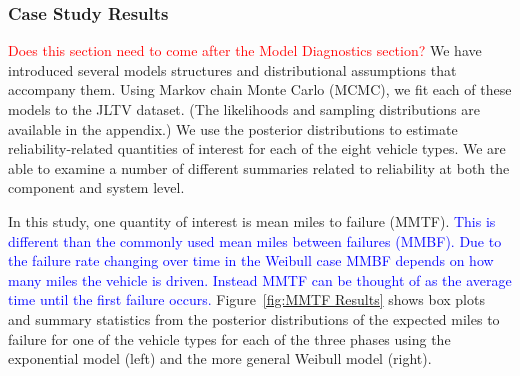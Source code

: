 \documentclass[12pt]{article}
\begin{document}
\subsubsection{Case Study Results}
\textcolor{red}{Does this section need to come after the Model Diagnostics section?}
We have introduced several models structures and distributional assumptions that accompany them.  Using Markov chain Monte Carlo (MCMC), we fit each of these models to the JLTV
dataset. (The likelihoods and sampling distributions are available in the appendix.) We use the posterior distributions to estimate reliability-related quantities of interest for each of the eight vehicle types.  We are able to examine a number of different summaries related to reliability at both the component and system level.

In this study, one quantity of interest is mean miles to failure (MMTF). \textcolor{blue}{This is different than the commonly used mean miles between failures (MMBF).  Due to the failure rate changing over time in the Weibull case MMBF depends on how many miles the vehicle is driven.  Instead MMTF can be thought of as the average time until the first failure occurs.} Figure~\ref{fig:MMTF Results} shows box plots and summary statistics from the posterior distributions of the expected miles to failure for one of the vehicle types for each of the three phases using the exponential model (left) and the more general Weibull model (right).
\end{document}
